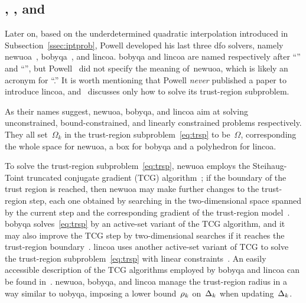 \documentclass[
    smallextended,  %
    final,        %
]{svjour3}
\newcommand{\fsetm}[1][k]{\Omega_{#1}}
\newcommand{\fset}{\Omega}
\newcommand{\rad}[1][k]{\Delta\ifthenelse{\equal{#1}{}}{}{_{#1}}}
\newcommand{\radlb}[1][k]{\rho\ifthenelse{\equal{#1}{}}{}{_{#1}}}
\begin{document}
\subsection{, , and }
\label{ssec:nbloa}

Later on, based on the underdetermined quadratic interpolation introduced in Subsection~\ref{ssec:iptprob},
Powell developed his last three \gls{dfo} solvers, namely \gls{newuoa}~\cite{Powell_2006,Powell_2008}, \gls{bobyqa}~\cite{Powell_2009}, and \gls{lincoa}.
\Gls{bobyqa} and \gls{lincoa} are named respectively after ``'' and
``'', but Powell~\cite{Powell_2006,Powell_2008} did not specify the meaning
of~\gls{newuoa}, which is likely an acronym for ``.''
It is worth mentioning that Powell \emph{never} published a paper to introduce \gls{lincoa},
and~\cite{Powell_2015} discusses only how to solve its trust-region subproblem.

As their names suggest, \gls{newuoa}, \gls{bobyqa}, and \gls{lincoa} aim at solving unconstrained,
bound-constrained, and linearly constrained problems respectively.
They all set~$\fsetm$ in the trust-region subproblem~\eqref{eq:trsp} to be~$\fset$, corresponding the whole space for \gls{newuoa}, a box for \gls{bobyqa} and a polyhedron for \gls{lincoa}.

To solve the trust-region subproblem~\eqref{eq:trsp}, \gls{newuoa} employs the
Steihaug-Toint truncated conjugate gradient (TCG) algorithm~\cite{Steihaug_1983,Toint_1981};
if the boundary of the trust region is reached, then \gls{newuoa} may make further
changes to the trust-region step, each one obtained by searching in the two-dimensional space
spanned by the current step and the corresponding gradient of the trust-region model~\cite[\S~5]{Powell_2006}.
\gls{bobyqa} solves~\eqref{eq:trsp} by an active-set variant of the TCG algorithm, and
it may also improve the TCG step by two-dimensional searches if it reaches the
trust-region boundary~\mbox{\cite[\S~3]{Powell_2009}}.
\gls{lincoa} uses another active-set variant of TCG to solve the trust-region
subproblem~\eqref{eq:trsp} with linear constraints~\cite[\S~3 and \S~5]{Powell_2015}.
An easily accessible description of the TCG algorithms employed by \gls{bobyqa} and \gls{lincoa}
can be found in~\cite[\S~6.2.1 and \S~6.2.2]{Ragonneau_2022}.
\gls{newuoa}, \gls{bobyqa}, and \gls{lincoa} manage the trust-region radius in a way similar to
\gls{uobyqa}, imposing a lower bound~$\radlb$ on~$\rad$ when updating~$\rad$.
\end{document}
